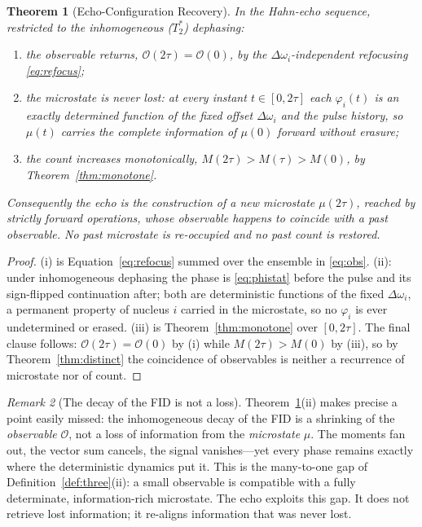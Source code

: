 \documentclass[11pt,a4paper]{article}
\theoremstyle{thmstyle}
\newtheorem{theorem}{Theorem}[section]
\theoremstyle{definition}
\theoremstyle{remark}
\newtheorem{remark}[theorem]{Remark}
\newcommand{\Tstar}{T_{2}^{*}}
\newcommand{\Count}{M}
\newcommand{\Obs}{\mathcal{O}}
\newcommand{\Mic}{\mu}
\begin{document}
\begin{theorem}[Echo-Configuration Recovery]
\label{thm:config}
In the Hahn-echo sequence, restricted to the inhomogeneous ($\Tstar$)
dephasing:
\begin{enumerate}[leftmargin=1.7em,label=(\roman*),itemsep=0.2em]
\item the observable returns, $\Obs(2\tau)=\Obs(0)$, by the
$\Delta\omega_{i}$-independent refocusing \eqref{eq:refocus};
\item the microstate is never lost: at every instant
$t\in[0,2\tau]$ each $\varphi_{i}(t)$ is an exactly determined function
of the fixed offset $\Delta\omega_{i}$ and the pulse history, so
$\Mic(t)$ carries the complete information of $\Mic(0)$ forward without
erasure;
\item the count increases monotonically,
$\Count(2\tau)>\Count(\tau)>\Count(0)$, by
Theorem~\ref{thm:monotone}.
\end{enumerate}
Consequently the echo is the construction of a \emph{new} microstate
$\Mic(2\tau)$, reached by strictly forward operations, whose
\emph{observable} happens to coincide with a past observable. No past
microstate is re-occupied and no past count is restored.
\end{theorem}

\begin{proof}
(i) is Equation~\eqref{eq:refocus} summed over the ensemble in
\eqref{eq:obs}. (ii): under inhomogeneous dephasing the phase is
\eqref{eq:phistat} before the pulse and its sign-flipped continuation
after; both are deterministic functions of the fixed $\Delta\omega_{i}$,
a permanent property of nucleus $i$ carried in the microstate, so no
$\varphi_{i}$ is ever undetermined or erased. (iii) is
Theorem~\ref{thm:monotone} over $[0,2\tau]$. The final clause follows:
$\Obs(2\tau)=\Obs(0)$ by (i) while $\Count(2\tau)>\Count(0)$ by (iii),
so by Theorem~\ref{thm:distinct} the coincidence of observables is
neither a recurrence of microstate nor of count.
\end{proof}

\begin{remark}[The decay of the FID is not a loss]
\label{rem:not-loss}
Theorem~\ref{thm:config}(ii) makes precise a point easily missed: the
inhomogeneous decay of the FID is a shrinking of the \emph{observable}
$\Obs$, not a loss of information from the \emph{microstate} $\Mic$. The
moments fan out, the vector sum cancels, the signal vanishes---yet every
phase remains exactly where the deterministic dynamics put it. This is
the many-to-one gap of Definition~\ref{def:three}(ii): a small
observable is compatible with a fully determinate, information-rich
microstate. The echo exploits this gap. It does not retrieve lost
information; it re-aligns information that was never lost.
\end{remark}
\end{document}
